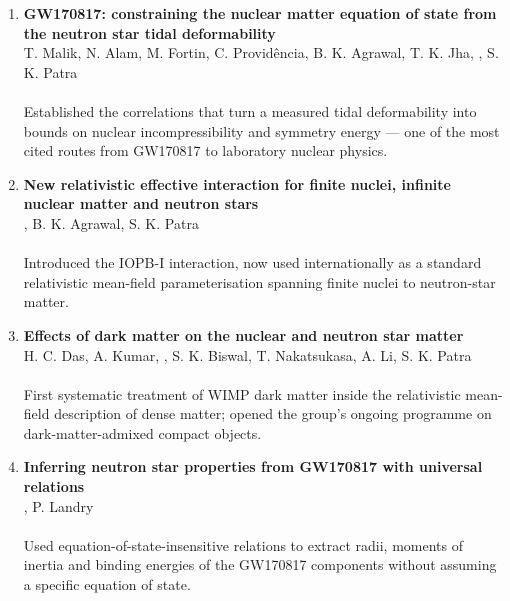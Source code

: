 

\vspace{4pt}
\begin{enumerate}

\item \textbf{GW170817: constraining the nuclear matter equation of state from
the neutron star tidal deformability} \quad {}\\
T. Malik, N. Alam, M. Fortin, C. Provid\^encia, B. K. Agrawal, T. K. Jha,
\me, S. K. Patra \\
\quad {}\\
{\small Established the correlations that turn a measured tidal deformability
into bounds on nuclear incompressibility and symmetry energy --- one of the most
cited routes from GW170817 to laboratory nuclear physics.}

\item \lead\textbf{New relativistic effective interaction for finite nuclei,
infinite nuclear matter and neutron stars} \quad {}\\
\me, B. K. Agrawal, S. K. Patra \\
\quad {}\\
{\small Introduced the IOPB-I interaction, now used internationally as a
standard relativistic mean-field parameterisation spanning finite nuclei to
neutron-star matter.}

\item \textbf{Effects of dark matter on the nuclear and neutron star matter}
\quad {}\\
H. C. Das, A. Kumar, \me, S. K. Biswal, T. Nakatsukasa, A. Li, S. K. Patra \\
\quad
{}\\
{\small First systematic treatment of WIMP dark matter inside the relativistic
mean-field description of dense matter; opened the group's ongoing programme on
dark-matter-admixed compact objects.}

\item \lead\textbf{Inferring neutron star properties from GW170817 with
universal relations} \quad {}\\
\me, P. Landry \\
\quad {}\\
{\small Used equation-of-state-insensitive relations to extract radii, moments
of inertia and binding energies of the GW170817 components without assuming a
specific equation of state.}


\end{enumerate}

